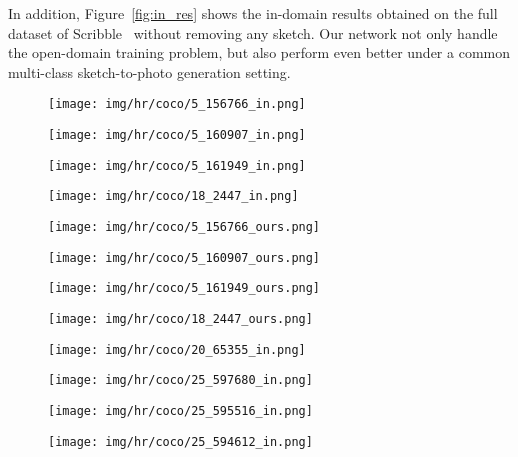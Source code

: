 \documentclass[10pt,twocolumn,letterpaper]{article}
\begin{document}
In addition, Figure~\ref{fig:in_res} shows the in-domain results obtained on the full dataset of Scribble~\cite{ghosh2019interactive} without removing any sketch. Our network not only handle the open-domain training problem, but also perform even better under a common multi-class sketch-to-photo generation setting.

\newcommand{\inwidth}{0.20} 
\begin{figure*}[tbp]
\captionsetup[subfigure]{labelformat=empty}
\begin{center}
\begin{subfigure}[b]{\inwidth\linewidth}
  \texttt{[image: img/hr/coco/5\_156766\_in.png]}
  \end{subfigure}
  \begin{subfigure}[b]{\inwidth\linewidth}
  \texttt{[image: img/hr/coco/5\_160907\_in.png]}
  \end{subfigure}
  \begin{subfigure}[b]{\inwidth\linewidth}
  \texttt{[image: img/hr/coco/5\_161949\_in.png]}
  \end{subfigure}
\begin{subfigure}[b]{\inwidth\linewidth}
  \texttt{[image: img/hr/coco/18\_2447\_in.png]}
  \end{subfigure}
  
\begin{subfigure}[b]{\inwidth\linewidth}
  \texttt{[image: img/hr/coco/5\_156766\_ours.png]}
  \end{subfigure}
  \begin{subfigure}[b]{\inwidth\linewidth}
  \texttt{[image: img/hr/coco/5\_160907\_ours.png]}
  \end{subfigure}
  \begin{subfigure}[b]{\inwidth\linewidth}
  \texttt{[image: img/hr/coco/5\_161949\_ours.png]}
  \end{subfigure}
\begin{subfigure}[b]{\inwidth\linewidth}
  \texttt{[image: img/hr/coco/18\_2447\_ours.png]}
  \end{subfigure}

  \begin{subfigure}[b]{\inwidth\linewidth}
  \texttt{[image: img/hr/coco/20\_65355\_in.png]}
  \end{subfigure}
  \begin{subfigure}[b]{\inwidth\linewidth}
  \texttt{[image: img/hr/coco/25\_597680\_in.png]}
  \end{subfigure}
\begin{subfigure}[b]{\inwidth\linewidth}
  \texttt{[image: img/hr/coco/25\_595516\_in.png]}
  \end{subfigure}
  \begin{subfigure}[b]{\inwidth\linewidth}
  \texttt{[image: img/hr/coco/25\_594612\_in.png]}
  \end{subfigure}
  

\end{center}
\end{figure*}
\end{document}
